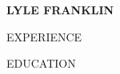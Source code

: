 \documentclass[a4paper,10pt]{article}
\newcommand{\name}[1]{\textbf{\huge{#1}}}
\begin{document}
\name{LYLE FRANKLIN}

\begin{minipage}[t]{0.6\textwidth}
EXPERIENCE

\hrulefill
\end{minipage}
\hspace{0.1 in}
\begin{minipage}[t]{0.3\textwidth}
EDUCATION

\hrulefill
\end{minipage}
\end{document}
